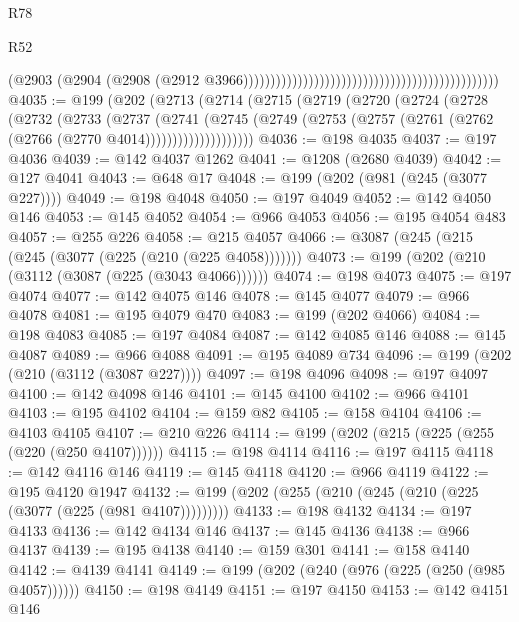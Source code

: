 \begin{lexlean}{R78}
\begin{lexlean}{R52}
\begin{coremodule}
{{{{{{{{{{{{{{{{{{{{{{{{{{{{{{{{{{{{{{{{{{{{{{{{{{{{{{{{{{{{{{{{{{{{{{{{{{{{{{{{{{{{{{{{{{{{{{{{{{{{{{{{{{{{{{{{{{{{{{{{{{{{{{{{{{{{{{{{{{{{{{{{{{{{{{{{{{{{{{{{{{{{{{{{{{{{{{{{{{{{{{{{{{{{{{{{{{{{{{                                                                                          (@2903
                                                                                            (@2904
                                                                                              (@2908
                                                                                                (@2912
                                                                                                  @3966)))))))))))))))))))))))))))))))))))))))))))))))
@4035 := @199
    (@202
      (@2713
        (@2714
          (@2715
            (@2719
              (@2720
                (@2724
                  (@2728
                    (@2732
                      (@2733
                        (@2737
                          (@2741
                            (@2745
                              (@2749
                                (@2753 (@2757 (@2761 (@2762 (@2766 (@2770 @4014))))))))))))))))))))
@4036 := @198 @4035
@4037 := @197 @4036
@4039 := @142 @4037 @1262
@4041 := @1208 (@2680 @4039)
@4042 := @127 @4041
@4043 := @648 @17
@4048 := @199 (@202 (@981 (@245 (@3077 @227))))
@4049 := @198 @4048
@4050 := @197 @4049
@4052 := @142 @4050 @146
@4053 := @145 @4052
@4054 := @966 @4053
@4056 := @195 @4054 @483
@4057 := @255 @226
@4058 := @215 @4057
@4066 := @3087 (@245 (@215 (@245 (@3077 (@225 (@210 (@225 @4058)))))))
@4073 := @199 (@202 (@210 (@3112 (@3087 (@225 (@3043 @4066))))))
@4074 := @198 @4073
@4075 := @197 @4074
@4077 := @142 @4075 @146
@4078 := @145 @4077
@4079 := @966 @4078
@4081 := @195 @4079 @470
@4083 := @199 (@202 @4066)
@4084 := @198 @4083
@4085 := @197 @4084
@4087 := @142 @4085 @146
@4088 := @145 @4087
@4089 := @966 @4088
@4091 := @195 @4089 @734
@4096 := @199 (@202 (@210 (@3112 (@3087 @227))))
@4097 := @198 @4096
@4098 := @197 @4097
@4100 := @142 @4098 @146
@4101 := @145 @4100
@4102 := @966 @4101
@4103 := @195 @4102
@4104 := @159 @82
@4105 := @158 @4104
@4106 := @4103 @4105
@4107 := @210 @226
@4114 := @199 (@202 (@215 (@225 (@255 (@220 (@250 @4107))))))
@4115 := @198 @4114
@4116 := @197 @4115
@4118 := @142 @4116 @146
@4119 := @145 @4118
@4120 := @966 @4119
@4122 := @195 @4120 @1947
@4132 := @199 (@202 (@255 (@210 (@245 (@210 (@225 (@3077 (@225 (@981 @4107)))))))))
@4133 := @198 @4132
@4134 := @197 @4133
@4136 := @142 @4134 @146
@4137 := @145 @4136
@4138 := @966 @4137
@4139 := @195 @4138
@4140 := @159 @301
@4141 := @158 @4140
@4142 := @4139 @4141
@4149 := @199 (@202 (@240 (@976 (@225 (@250 (@985 @4057))))))
@4150 := @198 @4149
@4151 := @197 @4150
@4153 := @142 @4151 @146
}}}}}}}}}}}}}}}}}}}}}}}}}}}}}}}}}}}}}}}}}}}}}}}}}}}}}}}}}}}}}}}}}}}}}}}}}}}}}}}}}}}}}}}}}}}}}}}}}}}}}}}}}}}}}}}}}}}}}}}}}}}}}}}}}}}}}}}}}}}}}}}}}}}}}}}}}}}}}}}}}}}}}}}}}}}}}}}}}}}}}}}}}}}}}}}}}}}}}}
\end{coremodule}
\end{lexlean}
\end{lexlean}
